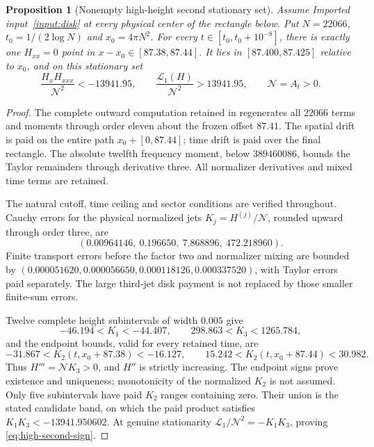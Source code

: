 \documentclass[11pt]{article}
\newtheorem{proposition}[theorem]{Proposition}
\theoremstyle{definition}
\theoremstyle{remark}
\begin{document}
\begin{proposition}[Nonempty high-height second stationary set]
\label{prop:high-second-sign}
Assume Imported input~\ref{input:disk} at every physical center of the
rectangle below. Put
$N=22066$, $t_0=1/(2\log N)$ and $x_0=4\pi N^2$.
For every $t\in[t_0,t_0+10^{-8}]$, there is exactly one
$H_{xx}=0$ point in $x-x_0\in[87.38,87.44]$. It lies in
$[87.400,87.425]$ relative to $x_0$, and on this stationary set
\begin{equation}
 \frac{H_xH_{xxx}}{\mathcal N^2}<-13941.95,\qquad
 \frac{\mathscr L_1(H)}{\mathcal N^2}>13941.95,
 \qquad \mathcal N=A_t>0.
 \label{eq:high-second-sign}
\end{equation}
\end{proposition}
\begin{proof}
The complete outward computation retained in \cite{signedcontinuation}
regenerates all $22066$ terms and moments through order eleven about
the frozen offset $87.41$. The spatial drift is paid on the entire
path $x_0+[0,87.44]$; time drift is paid over the final rectangle.
The absolute twelfth frequency moment, below $389460086$, bounds
the Taylor remainders through derivative three. All normalizer
derivatives and mixed time terms are retained.

The natural cutoff, time ceiling and sector conditions are verified
throughout. Cauchy errors for the physical normalized jets
$K_j=H^{(j)}/\mathcal N$, rounded upward through order three, are
\[
 (0.00964146,\ 0.196650,\ 7.868896,\ 472.218960).
\]
Finite transport errors before the factor two and normalizer mixing
are bounded by
$(0.000051620,0.000056650,0.000118126,0.000337520)$, with
Taylor errors paid separately. The large third-jet disk payment
is not replaced by those smaller finite-sum errors.

Twelve complete height subintervals of width $0.005$ give
\[
 -46.194<K_1<-44.407,\qquad 298.863<K_3<1265.784,
\]
and the endpoint bounds, valid for every retained time, are
\[
 -31.867<K_2(t,x_0+87.38)<-16.127,\qquad
 15.242<K_2(t,x_0+87.44)<30.982.
\]
Thus $H'''=\mathcal NK_3>0$, and $H''$ is strictly increasing.
The endpoint signs prove existence and uniqueness; monotonicity of
the normalized $K_2$ is not assumed. Only five subintervals have
paid $K_2$ ranges containing zero. Their union is the stated
candidate band, on which the paid product satisfies
$K_1K_3<-13941.950602$. At genuine stationarity
$\mathscr L_1/\mathcal N^2=-K_1K_3$, proving
\eqref{eq:high-second-sign}.
\end{proof}
\end{document}
